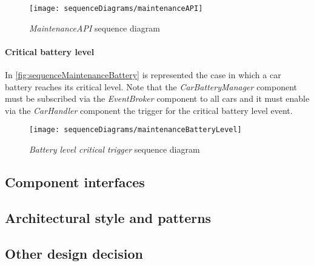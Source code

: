 \begin{figure}[h!]
	\centering
	\texttt{[image: sequenceDiagrams/maintenanceAPI]}
	\caption{
		\label{fig:sequenceMaintenanceAPI} 
		\emph{MaintenanceAPI} sequence diagram
	}
\end{figure}

\paragraph{Critical battery level}In \autoref{fig:sequenceMaintenanceBattery} is represented the case in which a car battery reaches its critical level. Note that the \emph{CarBatteryManager} component must be subscribed via the \mbox{\emph{EventBroker}} component to all cars and it must enable via the \emph{CarHandler} component the trigger for the critical battery level event.
\begin{figure}[h!]
	\centering
	\texttt{[image: sequenceDiagrams/maintenanceBatteryLevel]}
	\caption{
		\label{fig:sequenceMaintenanceBattery} 
		\emph{Battery level critical trigger} sequence diagram
	}
\end{figure}
\subsection{Component interfaces}
\subsection{Architectural style and patterns}
\subsection{Other design decision}

